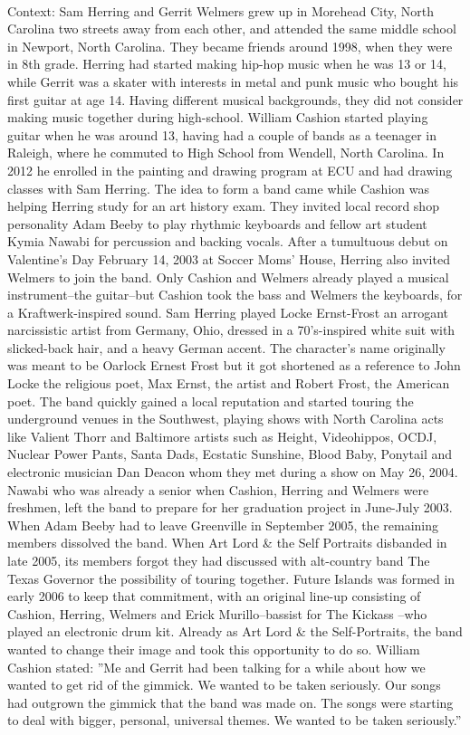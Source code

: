 \documentclass[11pt,a4paper, onecolumn]{article}
\begin{document}
\\ Context: Sam Herring and Gerrit Welmers grew up in Morehead City, North Carolina two streets away from each other, and attended the same middle school in Newport, North Carolina. They became friends around 1998, when they were in 8th grade. Herring had started making hip-hop music when he was 13 or 14, while Gerrit was a skater with interests in metal and punk music who bought his first guitar at age 14. Having different musical backgrounds, they did not consider making music together during high-school. William Cashion started playing guitar when he was around 13, having had a couple of bands as a teenager in Raleigh, where he commuted to High School from Wendell, North Carolina. In 2012 he enrolled in the painting and drawing program at ECU and had drawing classes with Sam Herring. The idea to form a band came while Cashion was helping Herring study for an art history exam. They invited local record shop personality Adam Beeby to play rhythmic keyboards and fellow art student Kymia Nawabi for percussion and backing vocals. After a tumultuous debut on Valentine's Day February 14, 2003 at Soccer Moms' House, Herring also invited Welmers to join the band. Only Cashion and Welmers already played a musical instrument--the guitar--but Cashion took the bass and Welmers the keyboards, for a Kraftwerk-inspired sound. Sam Herring played Locke Ernst-Frost an arrogant narcissistic artist from Germany, Ohio, dressed in a 70's-inspired white suit with slicked-back hair, and a heavy German accent. The character's name originally was meant to be Oarlock Ernest Frost but it got shortened as a reference to John Locke the religious poet, Max Ernst, the artist and Robert Frost, the American poet. The band quickly gained a local reputation and started touring the underground venues in the Southwest, playing shows with North Carolina acts like Valient Thorr and Baltimore artists such as Height, Videohippos, OCDJ, Nuclear Power Pants, Santa Dads, Ecstatic Sunshine, Blood Baby, Ponytail and electronic musician Dan Deacon whom they met during a show on May 26, 2004. Nawabi who was already a senior when Cashion, Herring and Welmers were freshmen, left the band to prepare for her graduation project in June-July 2003. When Adam Beeby had to leave Greenville in September 2005, the remaining members dissolved the band. When Art Lord & the Self Portraits disbanded in late 2005, its members forgot they had discussed with alt-country band The Texas Governor the possibility of touring together. Future Islands was formed in early 2006 to keep that commitment, with an original line-up consisting of Cashion, Herring, Welmers and Erick Murillo--bassist for The Kickass --who played an electronic drum kit. Already as Art Lord & the Self-Portraits, the band wanted to change their image and took this opportunity to do so. William Cashion stated: ''Me and Gerrit had been talking for a while about how we wanted to get rid of the gimmick. We wanted to be taken seriously. Our songs had outgrown the gimmick that the band was made on. The songs were starting to deal with bigger, personal, universal themes. We wanted to be taken seriously.'' 
\end{document}
